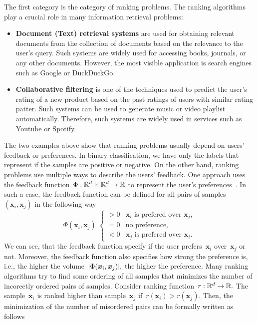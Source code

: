 The first category is the category of ranking problems. The ranking algorithms play a crucial role in many information retrieval problems:
\begin{itemize}
  \item \textbf{Document (Text) retrieval systems} are used for obtaining relevant documents from the collection of documents based on the relevance to the user's query. Such systems are widely used for accessing books, journals, or any other documents. However, the most visible application is search engines such as Google or DuckDuckGo.
  \item \textbf{Collaborative filtering} is one of the techniques used to predict the user's rating of a new product based on the past ratings of users with similar rating patter. Such systems can be used to generate music or video playlist automatically. Therefore, such systems are widely used in services such as Youtube or Spotify.
\end{itemize}
The two examples above show that ranking problems usually depend on users' feedback or preferences. In binary classification, we have only the labels that represent if the samples are positive or negative. On the other hand, ranking problems use multiple ways to describe the users' feedback. One approach uses the feedback function~$\Phi: \mathbb{R}^d \times \mathbb{R}^d \to \mathbb{R}$ to represent the user's preferences~\cite{freund2003efficient}. In such a case, the feedback function can be defined for all pairs of samples~$(\bm{x}_i, \bm{x}_j)$ in the following way
\begin{equation*}
  \Phi(\bm{x}_i, \bm{x}_j) \; 
  \begin{cases}
    > 0 & \bm{x}_i \text{ is prefered over } \bm{x}_j, \\
    = 0 & \text{no preference,} \\
    < 0 & \bm{x}_j \text{ is prefered over } \bm{x}_i.
  \end{cases}
\end{equation*}
We can see, that the feedback function specify if the user prefers~$\bm{x}_i$ over~$\bm{x}_j$ or not. Moreover, the feedback function also specifies how strong the preference is, i.e., the higher the volume~$|\Phi(\bm{x}_i, \bm{x}_j)|,$ the higher the preference. Many ranking algorithms try to find some ordering of all samples that minimizes the number of incorectly ordered pairs of samples. Consider ranking function~$r: \mathbb{R}^d \to \mathbb{R}.$ The sample~$\bm{x}_i$ is ranked higher than sample~$\bm{x}_j$ if~$r(\bm{x}_i) > r(\bm{x}_j).$ Then, the minimization of the number of misordered pairs can be formally written as follows
